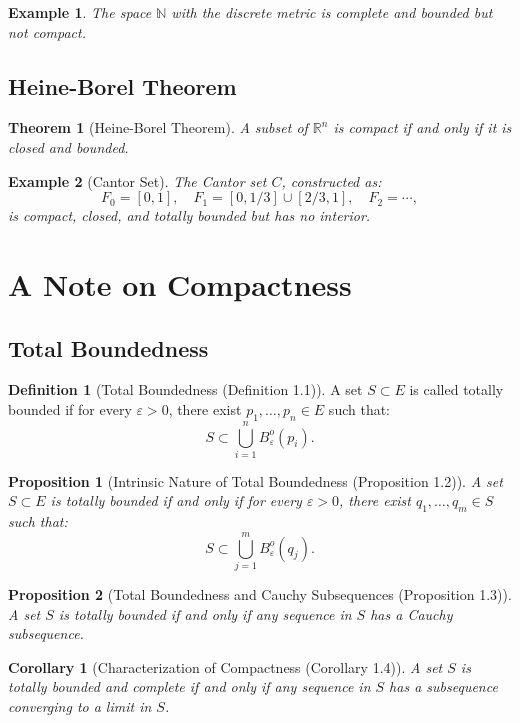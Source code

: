 \documentclass[9pt]{article}
\theoremstyle{definition}
\newtheorem{definition}{Definition}
\theoremstyle{plain}
\newtheorem{theorem}{Theorem}
\newtheorem{proposition}{Proposition}
\newtheorem{example}{Example}
\newtheorem{corollary}{Corollary}
\begin{document}
\begin{example}
The space \( \mathbb{N} \) with the discrete metric is complete and bounded but not compact.
\end{example}

\subsection*{Heine-Borel Theorem}
\begin{theorem}[Heine-Borel Theorem]
A subset of \( \mathbb{R}^n \) is compact if and only if it is closed and bounded.
\end{theorem}

\begin{example}[Cantor Set]
The Cantor set \( C \), constructed as:
\[
F_0 = [0, 1], \quad F_1 = [0, 1/3] \cup [2/3, 1], \quad F_2 = \cdots,
\]
is compact, closed, and totally bounded but has no interior.
\end{example}
\section*{A Note on Compactness}

\subsection*{Total Boundedness}
\begin{definition}[Total Boundedness (Definition 1.1)]
A set \( S \subset E \) is called totally bounded if for every \( \varepsilon > 0 \), there exist \( p_1, \ldots, p_n \in E \) such that:
\[
S \subset \bigcup_{i=1}^n B_\varepsilon^o(p_i).
\]
\end{definition}

\begin{proposition}[Intrinsic Nature of Total Boundedness (Proposition 1.2)]
A set \( S \subset E \) is totally bounded if and only if for every \( \varepsilon > 0 \), there exist \( q_1, \ldots, q_m \in S \) such that:
\[
S \subset \bigcup_{j=1}^m B_\varepsilon^o(q_j).
\]
\end{proposition}

\begin{proposition}[Total Boundedness and Cauchy Subsequences (Proposition 1.3)]
A set \( S \) is totally bounded if and only if any sequence in \( S \) has a Cauchy subsequence.
\end{proposition}

\begin{corollary}[Characterization of Compactness (Corollary 1.4)]
A set \( S \) is totally bounded and complete if and only if any sequence in \( S \) has a subsequence converging to a limit in \( S \).
\end{corollary}
\end{document}
